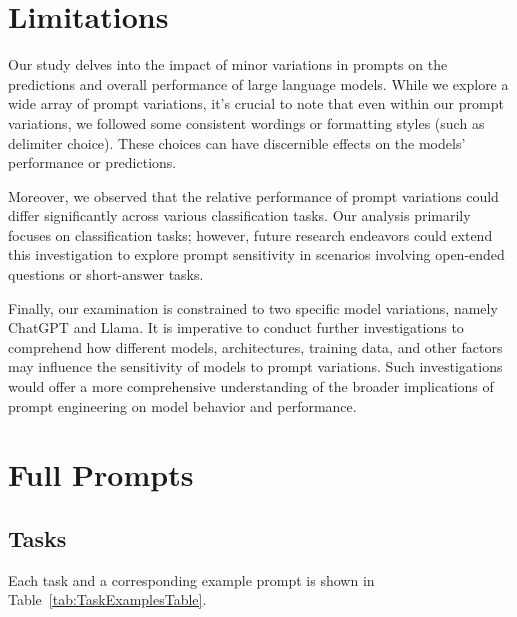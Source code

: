\documentclass[11pt, dvipsnames]{article}
\begin{document}
\section{Limitations}
Our study delves into the impact of minor variations in prompts on the predictions and overall performance of large language models. While we explore a wide array of prompt variations, it's crucial to note that even within our prompt variations, we followed some consistent wordings or formatting styles (such as delimiter choice). These choices can have discernible effects on the models' performance or predictions. 

Moreover, we observed that the relative performance of prompt variations could differ significantly across various classification tasks. Our analysis primarily focuses on classification tasks; however, future research endeavors could extend this investigation to explore prompt sensitivity in scenarios involving open-ended questions or short-answer tasks.

Finally, our examination is constrained to two specific model variations, namely ChatGPT and Llama. It is imperative to conduct further investigations to comprehend how different models, architectures, training data, and other factors may influence the sensitivity of models to prompt variations. Such investigations would offer a more comprehensive understanding of the broader implications of prompt engineering on model behavior and performance.






\appendix
\label{sec:appendix}

\section{Full Prompts}
\label{Appendix_Full_Prompts}


\subsection{Tasks}
Each task and a corresponding example prompt is shown in Table~\ref{tab:TaskExamplesTable}.
\end{document}
